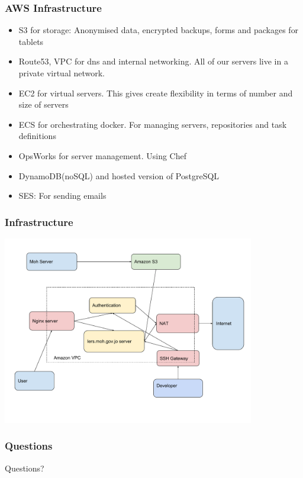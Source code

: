 \documentclass{beamer}
\begin{document}
\begin{frame}
  \frametitle{AWS Infrastructure}
  \begin{itemize}
  \item S3 for storage: Anonymised data, encrypted backups, forms and packages for tablets
  \item Route53, VPC for dns and internal networking. All of our servers live in a private virtual network.
  \item EC2 for virtual servers. This gives create flexibility in terms of number and size of servers
  \item ECS for orchestrating docker. For managing servers, repositories and task definitions
  \item OpsWorks for server management. Using Chef
  \item DynamoDB(noSQL) and hosted version of PostgreSQL 
  \item SES: For sending emails
  \end{itemize}
\end{frame}


\begin{frame}
   \frametitle{Infrastructure}
  \begin{center}
    \includegraphics[width=11cm]{am.pdf}
  \end{center}
\end{frame}
\begin{frame}
  \frametitle{Questions}
  \Huge Questions?
\end{frame}
\end{document}
